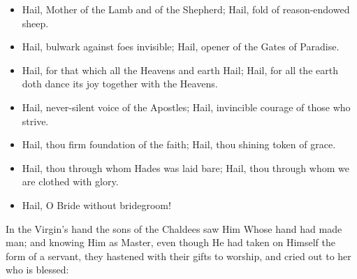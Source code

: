 \documentclass[twoside, letterpaper, 12pt]{report}
\begin{document}
\begin{itemize}[label=\tiny{+},leftmargin=*]
\item Hail, Mother of the Lamb and of the Shepherd;
      Hail, fold of reason-endowed sheep.
\item Hail, bulwark against foes invisible;
      Hail, opener of the Gates of Paradise.
\item Hail, for that which all the Heavens and earth Hail;
      Hail, for all the earth doth dance its joy together with the Heavens.
\item Hail, never-silent voice of the Apostles;
      Hail, invincible courage of those who strive.
\item Hail, thou firm foundation of the faith;
      Hail, thou shining token of grace.
\item Hail, thou through whom Hades was laid bare;
      Hail, thou through whom we are clothed with
glory. 
\item Hail, O Bride without bridegroom! 
\end{itemize}





\begin{priest}
  \item In the Virgin’s hand the sons of the Chaldees saw Him Whose hand had made man;
  and knowing Him as Master, even though He had taken on Himself the form of a servant,
  they hastened with their gifts to worship, and cried out to her who is blessed:
\end{priest}
\end{document}
